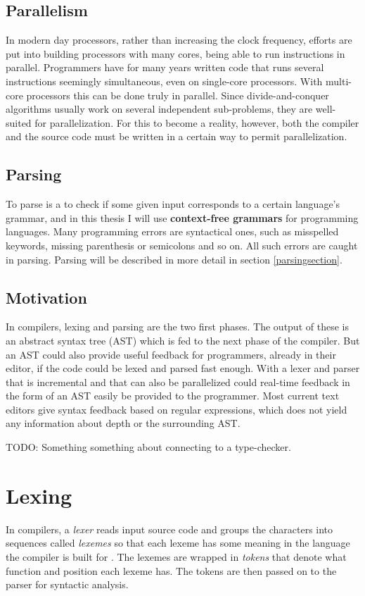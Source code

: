 \documentclass[a4paper,12pt,twosided]{report}
\begin{document}
\subsection{Parallelism}
In modern day processors, rather than increasing the clock frequency, efforts are
put into building processors with many cores, being able to run instructions in
parallel. Programmers have for many years written code that runs several
instructions seemingly simultaneous, even on single-core processors. With
multi-core processors this can be done truly in parallel. Since divide-and-conquer
algorithms usually work on several independent sub-problems, they are
well-suited for parallelization. For this to become a reality, however, both the
compiler and the source code must be written in a certain way to permit
parallelization.

\subsection{Parsing}
To parse is a to check if some given input corresponds to a certain language's
grammar, and in this thesis I will use \textbf{context-free grammars} for
programming languages. Many programming errors are syntactical ones, such as
misspelled keywords, missing parenthesis or semicolons and so on. All such
errors are caught in parsing. Parsing will be described in more detail in
section \ref{parsingsection}.

\subsection{Motivation}
In compilers, lexing and parsing are the two first phases. The output of these
is an abstract syntax tree (AST) which is fed to the next phase of the compiler.
But an AST could also provide useful feedback for programmers, already in their
editor, if the code could be lexed and parsed fast enough. With a lexer and
parser that is incremental and that can also be parallelized could real-time
feedback in the form of an AST easily be provided to the programmer. Most
current text editors give syntax feedback based on regular expressions, which
does not yield any information about depth or the surrounding AST.

TODO: Something something about connecting to a type-checker.

\section{Lexing}
In compilers, a \textit{lexer} reads input source code and groups the characters
into sequences called \textit{lexemes} so that each lexeme has some meaning in
the language the compiler is built for \cite[p. 5, p. 109]{dragonbook}. The
lexemes are wrapped in \textit{tokens} that denote what function and position
each lexeme has. The tokens are then passed on to the parser for syntactic
analysis.
\end{document}
